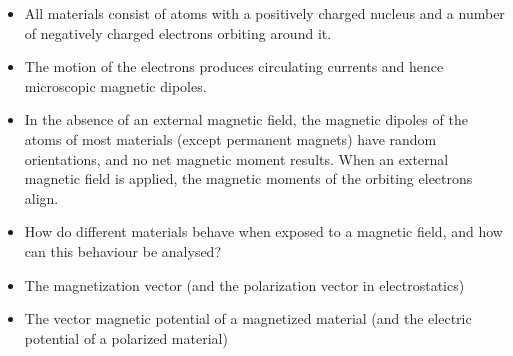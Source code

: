 \begin{ELunit}


\begin{itemize}
\tightlist
\item
  All materials consist of atoms with a positively charged nucleus and a number of negatively charged electrons orbiting around it.
\item
  The motion of the electrons produces circulating currents and hence microscopic magnetic dipoles.
\item
  In the absence of an external magnetic field, the magnetic dipoles of the atoms of most materials (except permanent magnets) have random orientations, and no net magnetic moment results. When an external magnetic field is applied, the magnetic moments of the orbiting electrons align.
\item
  How do different materials behave when exposed to a magnetic field, and how can this behaviour be analysed?
\end{itemize}

\end{ELunit}

\ELhold


\begin{ELunit}


\begin{itemize}
\tightlist
\item
  The magnetization vector (and the polarization vector in electrostatics)
\end{itemize}


\begin{itemize}
\tightlist
\item
  The vector magnetic potential of a magnetized material (and the electric potential of a polarized material)
\end{itemize}


\end{ELunit}

